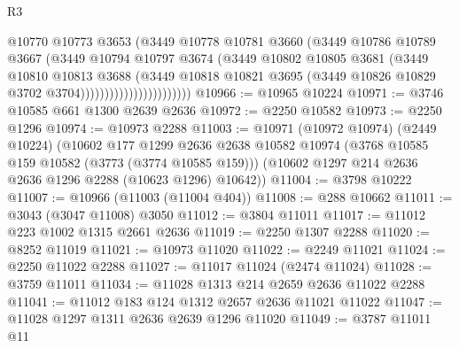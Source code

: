 \begin{lexlean}{R3}
\begin{coremodule}
                                    @10770
                                    @10773
                                    @3653
                                    (@3449
                                      @10778
                                      @10781
                                      @3660
                                      (@3449
                                        @10786
                                        @10789
                                        @3667
                                        (@3449
                                          @10794
                                          @10797
                                          @3674
                                          (@3449
                                            @10802
                                            @10805
                                            @3681
                                            (@3449
                                              @10810
                                              @10813
                                              @3688
                                              (@3449
                                                @10818
                                                @10821
                                                @3695
                                                (@3449
                                                  @10826
                                                  @10829
                                                  @3702
                                                  @3704)))))))))))))))))))))))
@10966 := @10965 @10224
@10971 := @3746 @10585 @661 @1300 @2639 @2636
@10972 := @2250 @10582
@10973 := @2250 @1296
@10974 := @10973 @2288
@11003 := @10971
    (@10972 @10974)
    (@2449 @10224)
    (@10602
      @177
      @1299
      @2636
      @2638
      @10582
      @10974
      (@3768 @10585 @159 @10582 (@3773 (@3774 @10585 @159)))
      (@10602 @1297 @214 @2636 @2636 @1296 @2288 (@10623 @1296) @10642))
@11004 := @3798 @10222
@11007 := @10966 (@11003 (@11004 @404))
@11008 := @288 @10662
@11011 := @3043 (@3047 @11008) @3050
@11012 := @3804 @11011
@11017 := @11012 @223 @1002 @1315 @2661 @2636
@11019 := @2250 @1307 @2288
@11020 := @8252 @11019
@11021 := @10973 @11020
@11022 := @2249 @11021
@11024 := @2250 @11022 @2288
@11027 := @11017 @11024 (@2474 @11024)
@11028 := @3759 @11011
@11034 := @11028 @1313 @214 @2659 @2636 @11022 @2288
@11041 := @11012 @183 @124 @1312 @2657 @2636 @11021 @11022
@11047 := @11028 @1297 @1311 @2636 @2639 @1296 @11020
@11049 := @3787 @11011 @11

\end{coremodule}
\end{lexlean}
